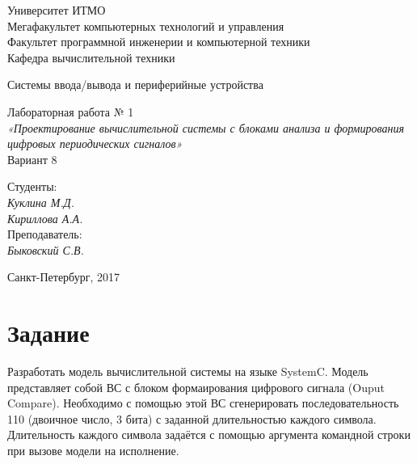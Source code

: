 \documentclass[12pt, a4paper] {ncc}
\begin{document}
\setcounter{figure}{0}
\frenchspacing
\pagestyle{empty}
\begin{center}
                            Университет ИТМО    \\
					Мегафакультет компьютерных технологий и управления \\ 
					Факультет программной инженерии и компьютерной техники \\
                        Кафедра вычислительной техники

                Системы ввода/вывода и периферийные устройства
\end{center}
\begin{center}
				Лабораторная работа № 1 \\
			{\it «Проектирование вычислительной системы с блоками
				  анализа и формирования цифровых периодических сигналов»}\\
					Вариант 8
\end{center}
\begin{flushright}
                                    Студенты:\\
                                    {\it Куклина М.Д.}\\
                                    {\it Кириллова А.А.}\\
                                    Преподаватель: \\
                                    {\it Быковский С.В.}
\end{flushright}
\begin{center}
                             Санкт-Петербург, 2017
\end{center}
\newpage


\section{Задание}
    Разработать модель вычислительной системы на языке SystemC. Модель представляет
собой ВС с блоком формаирования цифрового сигнала (Ouput Compare). Необходимо с
помощью этой ВС сгенерировать последовательность 110 (двоичное число, 3 бита) с
заданной длительностью каждого символа. Длительность каждого символа задаётся с
помощью аргумента командной строки при вызове модели на исполнение.
\end{document}
